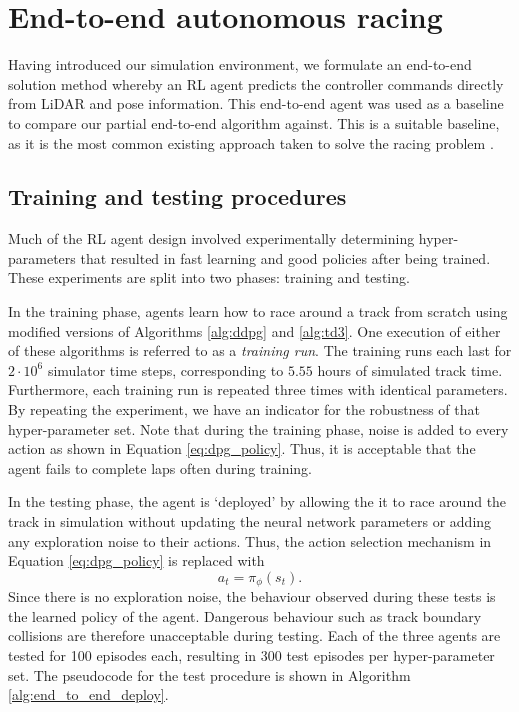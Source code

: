 \chapter{End-to-end autonomous racing}
\label{chp:end_to_end_autonomous racing}
Having introduced our simulation environment, we formulate an end-to-end solution method whereby an RL agent predicts the controller commands directly from LiDAR and pose information.
This end-to-end agent was used as a baseline to compare our partial end-to-end algorithm against.
This is a suitable baseline, as it is the most common existing approach taken to solve the racing problem \cite{Song2021,  Fuchs2021, Ivanov2020, Perot2017, Jaritz2018, Schwarting2021, Niu2020, hsu2022, Chisari2021, brunnbauer2021, Remonda2021}.


\section{Training and testing procedures}
\label{sec:train_and_test_procedures}
Much of the RL agent design involved experimentally determining hyper-parameters that resulted in fast learning and good policies after being trained.
These experiments are split into two phases: training and testing.

In the training phase, agents learn how to race around a track from scratch using modified versions of Algorithms \ref{alg:ddpg} and \ref{alg:td3}.
One execution of either of these algorithms is referred to as a \emph{training run}.
The training runs each last for $2\cdot10^6$ simulator time steps, corresponding to $5.55$ hours of simulated track time.
Furthermore, each training run is repeated three times with identical parameters.
By repeating the experiment, we have an indicator for the robustness of that hyper-parameter set.
Note that during the training phase, noise is added to every action as shown in Equation \ref{eq:dpg_policy}.
Thus, it is acceptable that the agent fails to complete laps often during training.

In the testing phase, the agent is `deployed' by allowing the it to race around the track in simulation without updating the neural network parameters or adding any exploration noise to their actions.
Thus, the action selection mechanism in Equation \ref{eq:dpg_policy} is replaced with 
\begin{equation}
    a_t = \pi_{\phi}(s_t).
\end{equation}
Since there is no exploration noise, the behaviour observed during these tests is the learned policy of the agent.
Dangerous behaviour such as track boundary collisions are therefore unacceptable during testing.
Each of the three agents are tested for 100 episodes each, resulting in 300 test episodes per hyper-parameter set.
The pseudocode for the test procedure is shown in Algorithm \ref{alg:end_to_end_deploy}.

